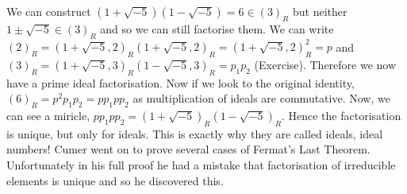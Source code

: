 \noindent
We can construct $(1 + \sqrt{-5})(1 - \sqrt{-5}) = 6 \in (3)_R$ but neither $1 \pm \sqrt{-5} \in (3)_R$ and so we can still factorise them. We can write $(2)_R = (1 + \sqrt{-5}, 2)_R(1 + \sqrt{-5}, 2)_R = (1 + \sqrt{-5}, 2)_R^2 = p$ and $(3)_R = (1 + \sqrt{-5}, 3)_R(1 - \sqrt{-5}, 3)_R = p_1p_2$ (Exercise).
Therefore we now have a prime ideal factorisation. Now if we look to the original identity, $(6)_R = p^2p_1p_2 = pp_1pp_2$ as multiplication of ideals are commutative. Now, we can see a miricle, $pp_1pp_2 = (1 + \sqrt{-5})_R(1 - \sqrt{-5})_R$. Hence the factorisation is unique, but only for ideals. This is exactly why they are called ideals, ideal numbers! Cumer went on to prove several cases of Fermat's Last Theorem. Unfortunately in his full proof he had a mistake that factorisation of irreducible elements is unique and so he discovered this.

